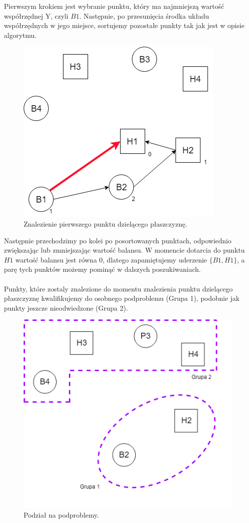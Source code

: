 \documentclass[10pt,a4paper]{article}
\begin{document}
	Pierwszym krokiem jest wybranie punktu, który ma najmniejszą wartość współrzędnej Y, czyli $B1$. Następnie, po przesunięcia środka układu współrzędnych w jego miejsce, sortujemy pozostałe punkty tak jak jest w opisie algorytmu. 
	
	\begin{figure}[H]
		\centering
 			\includegraphics[scale=0.5]{images/step2.png}
 			\caption{Znalezienie pierwszego punktu dzielącego płaszczyznę.}
 		\label{fig:step1}
	\end{figure}
	
	Następnie przechodzimy po kolei po posortowanych punktach, odpowiednio zwiększając lub zmniejszając wartość balansu. W momencie dotarcia do punktu $H1$ wartość balansu jest równa $0$, dlatego zapamiętujemy uderzenie $\{B1,H1\}$, a parę tych punktów możemy pominąć w dalszych poszukiwaniach.\\~\\
	Punkty, które zostaly znalezione do momentu znalezienia punktu dzielącego płaszczyznę kwalifikujemy do osobnego podproblemu (Grupa 1), podobnie jak punkty jeszcze nieodwiedzone (Grupa 2).
	
	\begin{figure}[H]
		\centering
 			\includegraphics[scale=0.5]{images/step3.png}
 			\caption{Podział na podproblemy.}
 		\label{fig:step1}
	\end{figure}		
\end{document}
